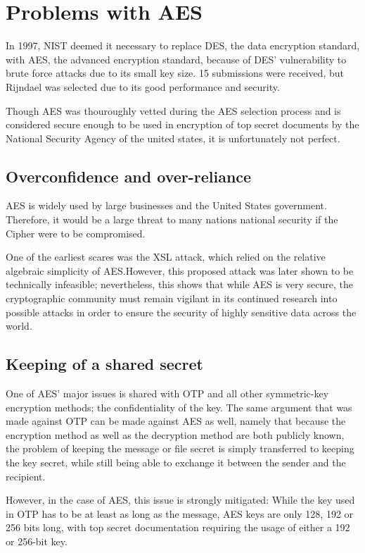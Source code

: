 \documentclass[12pt]{report}
\theoremstyle{definition}
\theoremstyle{remark}
\begin{document}
\section{Problems with AES}
In 1997, NIST deemed it necessary to replace DES, the data encryption standard, with AES, the advanced encryption standard, because of DES' vulnerability to brute force attacks due to its small key size. 15 submissions were received, but Rijndael was selected due to its good performance and security\cite{AESSelection}.

Though AES was thouroughly vetted during the AES selection process and is considered secure enough to be used in encryption of top secret documents by the National Security Agency\cite{CNSSPolicy} of the united states, it is unfortunately not perfect.

\subsection{Overconfidence and over-reliance}
AES is widely used by large businesses and the United States government. Therefore, it would be a large threat to many nations national security if the Cipher were to be compromised.

One of the earliest scares was the XSL attack, which relied on the relative algebraic simplicity of AES\cite{XSL}.However, this proposed attack was later shown to be technically infeasible\cite{XLSRebuked}; nevertheless, this shows that while AES is very secure, the cryptographic community must remain vigilant in its continued research into possible attacks in order to ensure the security of highly sensitive data across the world.

\subsection{Keeping of a shared secret}
One of AES' major issues is shared with OTP and all other symmetric-key encryption methods; the confidentiality of the key. The same argument that was made against OTP can be made against AES as well, namely that because the encryption method as well as the decryption method are both publicly known, the problem of keeping the message or file secret is simply transferred to keeping the key secret, while still being able to exchange it between the sender and the recipient.

However, in the case of AES, this issue is strongly mitigated: While the key used in OTP has to be at least as long as the message, AES keys are only 128, 192 or 256 bits long, with top secret documentation requiring the usage of either a 192 or 256-bit key\cite{CNSSPolicy}.

\printbibliography
\end{document}
